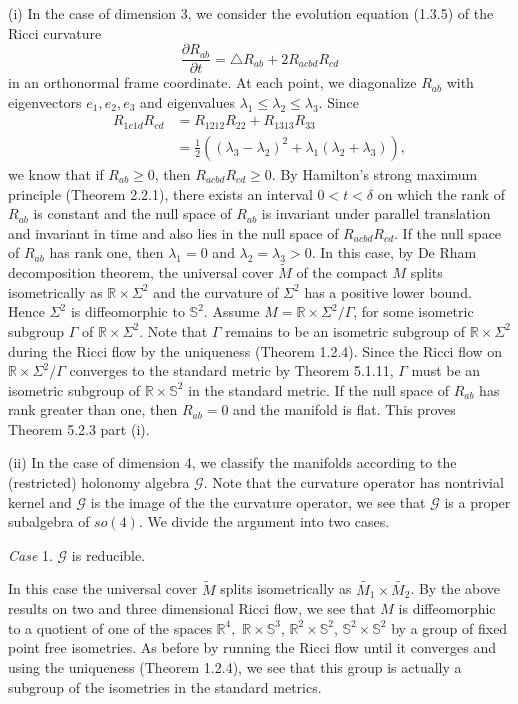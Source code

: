 \smallskip
(i) In the case of dimension 3, we consider the evolution equation
(1.3.5) of the Ricci curvature
$$
\frac{\partial R_{ab}}{\partial t} =\triangle
R_{ab}+2R_{acbd}R_{cd}
$$
in an orthonormal frame coordinate. At each point, we diagonalize
$R_{ab}$ with eigenvectors $e_{1}, e_{2}, e_{3}$ and eigenvalues
$\lambda_1\leq\lambda_2\leq\lambda_3$. Since
\begin{align*}
R_{1c1d}R_{cd}&  = R_{1212}R_{22}+R_{1313}R_{33}\\
&  =\frac{1}{2}((\lambda_{3}-\lambda_{2})^{2}
+\lambda_{1}(\lambda_2+\lambda_3)),
\end{align*}
we know that if $R_{ab}\geq 0$, then $R_{acbd}R_{cd}\geq0$. By
Hamilton's strong maximum principle (Theorem 2.2.1), there exists
an interval $0<t<\delta$ on which the rank of $R_{ab}$ is constant
and the null space of $R_{ab}$ is invariant under parallel
translation and invariant in time and also lies in the null space
of $R_{acbd}R_{cd}$. If the null space of $R_{ab}$ has rank one,
then $\lambda_1=0$ and $\lambda_2=\lambda_{3}>0$.  In this case,
by De Rham decomposition theorem, the universal cover $\tilde{M}$
of the compact $M$ splits isometrically as $\mathbb{R}\times
\Sigma^{2}$ and the curvature of $\Sigma^{2}$ has a positive lower
bound. Hence $\Sigma^{2}$ is diffeomorphic to $\mathbb{S}^{2}$.
Assume $M=\mathbb{R}\times \Sigma^{2}/\Gamma$, for some isometric
subgroup $\Gamma$ of $\mathbb{R}\times \Sigma^{2}$. Note that
$\Gamma$ remains to be an isometric subgroup of $\mathbb{R}\times
\Sigma^{2}$ during the Ricci flow by the uniqueness (Theorem
1.2.4). Since the Ricci flow on $\mathbb{R}\times
\Sigma^{2}/\Gamma$ converges to the standard metric by Theorem
5.1.11, $\Gamma$ must be an isometric subgroup of
$\mathbb{R}\times\mathbb{S}^{2}$ in the standard metric. If the
null space of $R_{ab}$ has rank greater than one, then $R_{ab}=0$
and the manifold is flat. This proves Theorem 5.2.3 part (i).

\smallskip
(ii) In the case of dimension 4, we classify the manifolds
according to the (restricted) holonomy algebra $\mathcal{G}$. Note
that the curvature operator has nontrivial kernel and
$\mathcal{G}$ is the image of the the curvature operator, we see
that $\mathcal{G}$ is a proper subalgebra of $so(4)$. We divide
the argument into two cases.

\smallskip
{\it Case} 1. $\mathcal{G}$ is reducible.

\smallskip
In this case the universal cover $\tilde{M}$ splits isometrically
as $\tilde{M_{1}}\times \tilde{M_{2}}$.  By the above results on
two and three dimensional Ricci flow, we see that ${M}$ is
diffeomorphic to a quotient of one of the spaces $\mathbb{R}^{4},$
$\mathbb{R}\times \mathbb{S}^{3}$, $\mathbb{R}^{2}\times
\mathbb{S}^{2}$, $\mathbb{S}^{2}\times \mathbb{S}^{2}$ by a group
of fixed point free isometries. As before by running the Ricci
flow until it converges and using the uniqueness (Theorem 1.2.4),
we see that this group is actually a subgroup of the isometries in
the standard metrics.

